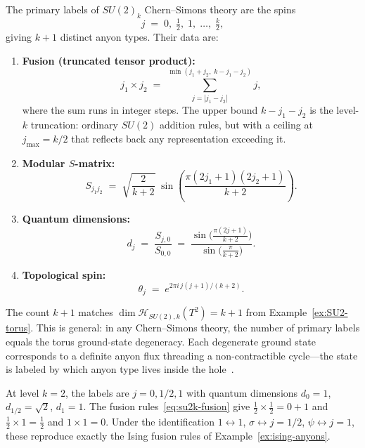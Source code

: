\begin{proposition}
\label{prop:su2k-anyon-data}
The primary labels of $SU(2)_k$ Chern--Simons theory are the spins
\begin{equation}
\label{eq:su2k-labels}
    j \;=\; 0,\; \tfrac{1}{2},\; 1,\; \ldots,\; \tfrac{k}{2},
\end{equation}
giving $k+1$ distinct anyon types.  Their data are:
\begin{enumerate}
    \item \textbf{Fusion (truncated tensor product):}
\begin{equation}
\label{eq:su2k-fusion}
    j_1 \times j_2 \;=\; \sum_{j = |j_1 - j_2|}^{\min(j_1 + j_2,\; k - j_1 - j_2)} j,
\end{equation}
    where the sum runs in integer steps.  The upper bound
    $k - j_1 - j_2$ is the level-$k$ truncation: ordinary $SU(2)$
    addition rules, but with a ceiling at $j_{\max} = k/2$ that reflects
    back any representation exceeding it.
    \item \textbf{Modular $S$-matrix:}
\begin{equation}
\label{eq:su2k-smatrix}
    S_{j_1 j_2} \;=\; \sqrt{\frac{2}{k+2}}\;
    \sin\!\left(\frac{\pi(2j_1 + 1)(2j_2 + 1)}{k+2}\right).
\end{equation}
    \item \textbf{Quantum dimensions:}
\begin{equation}
\label{eq:su2k-qdim}
    d_j \;=\; \frac{S_{j,0}}{S_{0,0}}
    \;=\; \frac{\sin\!\bigl(\frac{\pi(2j+1)}{k+2}\bigr)}
               {\sin\!\bigl(\frac{\pi}{k+2}\bigr)}.
\end{equation}
    \item \textbf{Topological spin:}
\begin{equation}
\label{eq:su2k-topspin}
    \theta_j \;=\; e^{2\pi i\, j(j+1)/(k+2)}.
\end{equation}
\end{enumerate}
\end{proposition}

\noindent
The count $k+1$ matches $\dim\mathcal{H}_{SU(2),k}(T^2) = k+1$ from
Example~\ref{ex:SU2-torus}.  This is general: in any Chern--Simons theory, the
number of primary labels equals the torus ground-state degeneracy.  Each
degenerate ground state corresponds to a definite anyon flux threading a
non-contractible cycle---the state is labeled by which anyon type lives inside
the hole~\cite{Witten1989Jones}.

\begin{example}
\label{ex:su2-level2}
At level $k=2$, the labels are $j = 0, 1/2, 1$ with quantum dimensions
$d_0 = 1$, $d_{1/2} = \sqrt{2}$, $d_1 = 1$.  The fusion
rules~\eqref{eq:su2k-fusion} give $\frac{1}{2} \times \frac{1}{2} = 0 + 1$
and $\frac{1}{2} \times 1 = \frac{1}{2}$ and $1 \times 1 = 0$.  Under the
identification $1 \leftrightarrow 1$, $\sigma \leftrightarrow j = 1/2$,
$\psi \leftrightarrow j = 1$, these reproduce exactly the Ising fusion
rules of Example~\ref{ex:ising-anyons}.
\end{example}

